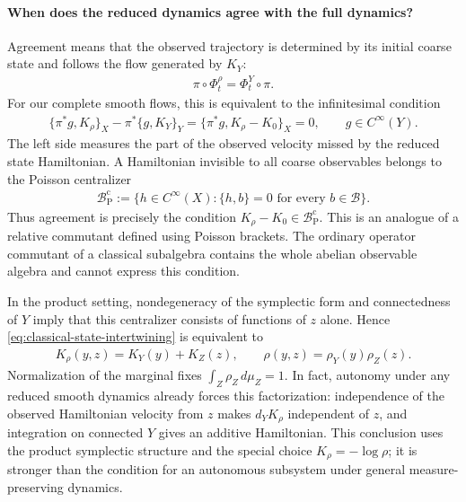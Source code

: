 \documentclass[a4paper,11pt]{article}
\theoremstyle{definition}
\begin{document}
\paragraph{When does the reduced dynamics agree with the full dynamics?}
Agreement means that the observed trajectory is determined by its initial coarse state and follows the flow generated by $K_Y$:
\begin{align}\label{eq:classical-state-intertwining}
    \pi\circ\Phi_t^\rho=\Phi_t^Y\circ\pi.
\end{align}
For our complete smooth flows, this is equivalent to the infinitesimal condition
\begin{align}\label{eq:classical-state-defect}
    \{\pi^*g,K_\rho\}_X-\pi^*\{g,K_Y\}_Y
    =\{\pi^*g,K_\rho-K_0\}_X=0,
    \qquad g\in C^\infty(Y).
\end{align}
The left side measures the part of the observed velocity missed by the reduced state Hamiltonian. A Hamiltonian invisible to all coarse observables belongs to the Poisson centralizer
\begin{align}
    \mathcal B^{\mathrm c}_{\mathrm P}
    :=\{h\in C^\infty(X):\{h,b\}=0\text{ for every }b\in\mathcal B\}.
\end{align}
Thus agreement is precisely the condition $K_\rho-K_0\in\mathcal B^{\mathrm c}_{\mathrm P}$. This is an analogue of a relative commutant defined using Poisson brackets. The ordinary operator commutant of a classical subalgebra contains the whole abelian observable algebra and cannot express this condition.

In the product setting, nondegeneracy of the symplectic form and connectedness of $Y$ imply that this centralizer consists of functions of $z$ alone. Hence \eqref{eq:classical-state-intertwining} is equivalent to
\begin{align}\label{eq:classical-product-state-closure}
    K_\rho(y,z)=K_Y(y)+K_Z(z),
    \qquad
    \rho(y,z)=\rho_Y(y)\rho_Z(z).
\end{align}
Normalization of the marginal fixes $\int_Z\rho_Z\,d\mu_Z=1$. In fact, autonomy under any reduced smooth dynamics already forces this factorization: independence of the observed Hamiltonian velocity from $z$ makes $d_YK_\rho$ independent of $z$, and integration on connected $Y$ gives an additive Hamiltonian. This conclusion uses the product symplectic structure and the special choice $K_\rho=-\log\rho$; it is stronger than the condition for an autonomous subsystem under general measure-preserving dynamics.
\end{document}

